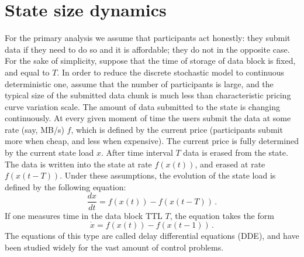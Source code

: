 \documentclass[]{llncs}   %
\begin{document}




\appendix

\section{State size dynamics}
\label{apx:statesize}
For the primary analysis we assume that participants act honestly: they submit
data if they need to do so and it is affordable; they do not in the opposite
case. For the sake of simplicity, suppose that the time of storage of data
block is fixed, and equal to $T$. In order to reduce the discrete stochastic
model to continuous deterministic one, assume that the number of participants
is large, and the typical size of the submitted data chunk is much less than
characteristic pricing curve variation scale. The amount of data submitted to
the state is changing continuously. At every given moment of time the users
submit the data at some rate (say, MB/s) $f$, which is defined by the current
price (participants submit more when cheap, and less when expensive). The
current price is fully determined by the current state load $x$. After time
interval $T$ data is erased from the state. The data is written into the state
at rate $f(x(t))$, and erased at rate $f(x(t-T))$. Under these assumptions,
the evolution of the state load is defined by the following equation:
\begin{equation}
    \frac{dx}{dt} = f(x(t))-f(x(t-T))\,.
    \label{eq:dde0}
\end{equation}
If one measures time in the data block TTL $T$, the equation takes the form
\begin{equation}
    \dot{x} = f(x(t))-f(x(t-1))\,.
    \label{eq:dde1}
\end{equation}
The equations of this type are called delay differential equations (DDE), and have
been studied widely for the vast amount of control problems.
\end{document}
